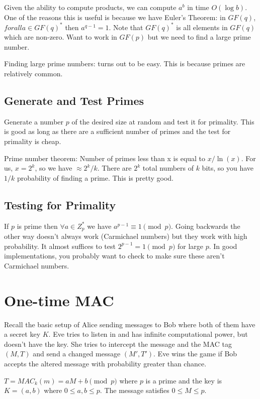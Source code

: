 \documentclass[psamsfonts]{amsart}
\begin{document}
Given the ability to compute products, we can compute $a^b$ in time $O(\log b)$. One of the reasons this is useful is because we have Euler's Theorem: in $GF(q)$, $forall a \in GF(q)^*$ then $a^{q-1} = 1$. Note that $GF(q)^*$ is all elements in $GF(q)$ which are non-zero. Want to work in $GF(p)$ but we need to find a large prime number.

Finding large prime numbers: turns out to be easy. This is because primes are relatively common.

\subsection{Generate and Test Primes}

Generate a number $p$ of the desired size at random and test it for primality. This is good as long as there are a sufficient number of primes and the test for primality is cheap.

Prime number theorem: Number of primes less than x is equal to $x / \ln(x)$. For us, $x = 2^k$, so we have $\approx 2^k / k$. There are $2^k$ total numbers of $k$ bits, so you have $1/k$ probability of finding a prime. This is pretty good.

\subsection{Testing for Primality}

If $p$ is prime then $\forall a \in Z_{p}^*$ we have $a^{p-1} \equiv 1 \pmod{p}$. Going backwards the other way doesn't always work (Carmichael numbers) but they work with high probability. It almost suffices to test $2^{p-1} = 1 \pmod{p}$ for large $p$. In good implementations, you probably want to check to make sure these aren't Carmichael numbers.

\section{One-time MAC}

Recall the basic setup of Alice sending messages to Bob where both of them have a secret key $K$. Eve tries to listen in and has infinite computational power, but doesn't have the key. She tries to intercept the message and the MAC tag $(M,T)$ and send a changed message $(M', T')$. Eve wins the game if Bob accepts the altered message with probability greater than chance.

$T = MAC_{k}(m) = a M + b \pmod{p}$ where $p$ is a prime and the key is $K=(a,b)$ where $0 \leq a, b \leq p$. The message satisfies $0 \leq M \leq p$. 
\end{document}
